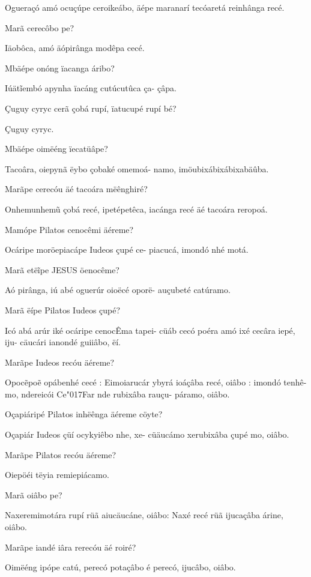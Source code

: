 \documentclass[openany,titlepage,12pt]{book}
\newcommand{\lgS}{\char"017F}
\begin{document}
\begin{altereven}
    \item Ogueraçó amó ocuçúpe ceroikeábo, äépe
        maranarí tecóaretá reinhânga recé.
    \item Marã cerecôbo pe?
    \item Iäobôca, amó äópirânga modêpa cecé.
    \item Mbäépe onóng ïacanga áribo?
    \item Iúät\~iembó apynha ïacáng cutúcutûca ça-
        çâpa.
    \item Çuguy cyryc cerã çobá rupí, ïatucupé\linebreak
        rupí bé?
    \item Çuguy cyryc.
    \item Mbäépe oimëéng ïecatüâpe?
    \item Tacoâra, oiepynã ëybo çobaké omemoá-
        namo, imöubixábixábixabäûba.
    \item Marãpe cerecóu äé tacoára mëênghiré?
    \item Onhemunhem\~u çobá recé, ipetépetêca,
        iacánga recé äé tacoára reropoá.
    \item Mamópe Pilatos cenocêmi äéreme?
    \item Ocáripe moröepiacápe Iudeos çupé ce-
        piacucá, imondó nhé motá.
    \pagebreak
    \item Marã etë\~ipe JESUS öenocême?
    \item Aó pirânga, iú abé oguerúr oioëcé oporë-
        auçubeté catúramo.
    \item Marã ëípe Pilatos Iudeos çupé?
    \item Icó abá arúr iké ocáripe cenocÊma tapei-
        cüáb cecó poéra amó ixé cecâra iepé, iju-
        cäucári ianondé guiiâbo, ëí.
    \item Marãpe Iudeos recóu äéreme?
    \item Opoc\~epo\~e opábenhé cecé :  Eimoiarucár
        ybyrá ioáçâba recé, oiâbo : imondó tenhê-
        mo, ndereicói Ce\lgS ar nde rubixâba rauçu-
        páramo, oiâbo.
    \item Oçapiáripé Pilatos inhëênga äéreme\linebreak
        cöyte?
    \item Oçapiár Iudeos çüí ocykyiêbo nhe, xe-
        cüäucámo xerubixâba çupé mo, oiâbo.
    \item Marãpe Pilatos recóu äéreme?
    \item Oiepöéi tëyia remiepiácamo.
    \item Marã oiâbo pe?
    \item Naxeremimotára rupí rüã aiucäucáne,\linebreak
        oiâbo: Naxé recé rüã ijucaçâba árine,\linebreak
        oiâbo.
    \item Marãpe iandé iâra rerecóu äé roiré?
    \item Oimëéng ipópe catú, perecó potaçâbo é
        perecó, ijucâbo, oiâbo.

\end{altereven}
\newpage
\end{document}
